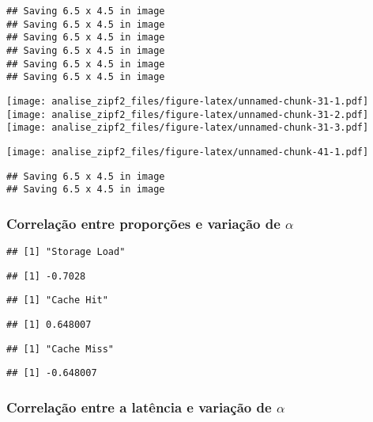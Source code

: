 \documentclass[
]{article}
\begin{document}
\begin{verbatim}
## Saving 6.5 x 4.5 in image
## Saving 6.5 x 4.5 in image
## Saving 6.5 x 4.5 in image
## Saving 6.5 x 4.5 in image
## Saving 6.5 x 4.5 in image
## Saving 6.5 x 4.5 in image
\end{verbatim}

\texttt{[image: analise\_zipf2\_files/figure-latex/unnamed-chunk-31-1.pdf]}
\texttt{[image: analise\_zipf2\_files/figure-latex/unnamed-chunk-31-2.pdf]}
\texttt{[image: analise\_zipf2\_files/figure-latex/unnamed-chunk-31-3.pdf]}

\texttt{[image: analise\_zipf2\_files/figure-latex/unnamed-chunk-41-1.pdf]}

\begin{verbatim}
## Saving 6.5 x 4.5 in image
## Saving 6.5 x 4.5 in image
\end{verbatim}

\hypertarget{correlauxe7uxe3o-entre-proporuxe7uxf5es-e-variauxe7uxe3o-de-alpha}{%
\subsubsection{\texorpdfstring{Correlação entre proporções e variação de
\(\alpha\)}{Correlação entre proporções e variação de \textbackslash alpha}}\label{correlauxe7uxe3o-entre-proporuxe7uxf5es-e-variauxe7uxe3o-de-alpha}}

\begin{verbatim}
## [1] "Storage Load"
\end{verbatim}

\begin{verbatim}
## [1] -0.7028
\end{verbatim}

\begin{verbatim}
## [1] "Cache Hit"
\end{verbatim}

\begin{verbatim}
## [1] 0.648007
\end{verbatim}

\begin{verbatim}
## [1] "Cache Miss"
\end{verbatim}

\begin{verbatim}
## [1] -0.648007
\end{verbatim}

\hypertarget{correlauxe7uxe3o-entre-a-latuxeancia-e-variauxe7uxe3o-de-alpha}{%
\subsubsection{\texorpdfstring{Correlação entre a latência e variação de
\(\alpha\)}{Correlação entre a latência e variação de \textbackslash alpha}}\label{correlauxe7uxe3o-entre-a-latuxeancia-e-variauxe7uxe3o-de-alpha}}
\end{document}
